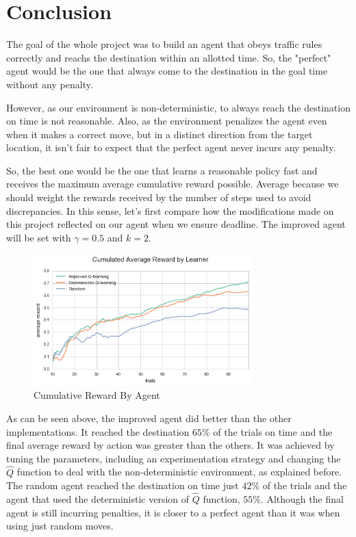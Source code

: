 \documentclass[a4paper]{article}
\begin{document}

\section{Conclusion}
\label{sec:conclusion}

The goal of the whole project was to build an agent that obeys traffic rules correctly and reachs the destination within an allotted time. So, the "perfect" agent would be the one that always come to the destination in the goal time without any penalty.

However, as our environment is non-deterministic, to always reach the destination on time is not reasonable. Also, as the environment penalizes the agent even when it makes a correct move, but in a distinct direction from the target location, it isn't fair to expect that the perfect agent never incurs any penalty.

So, the best one would be the one that learns a reasonable policy fast and receives the maximum average cumulative reward possible. Average because we should weight the rewards received by the number of steps used to avoid discrepancies. In this sense, let's first compare how the modifications made on this project reflected on our agent when we ensure deadline. The improved agent will be set with $\gamma=0.5$ and $k=2$.


\begin{figure}[ht!]
\centering
\includegraphics[width=0.75\textwidth]{images/performance_comparition.png}
\caption{\label{fig:perf_compr}Cumulative Reward By Agent}
\end{figure}

As can be seen above, the improved agent did better than the other implementations. It reached the destination $65\%$ of the trials on time and the final average reward by action was greater than the others. It was achieved by tuning the parameters, including an experimentation strategy and changing the $\hat{Q}$ function to deal with the non-deterministic environment, as explained before. The random agent reached the destination on time just $42\%$ of the trials and the agent that used the deterministic version of $\hat{Q}$ function, $55\%$. Although the final agent is still incurring penalties, it is closer to a perfect agent than it was when using just random moves.
\end{document}
